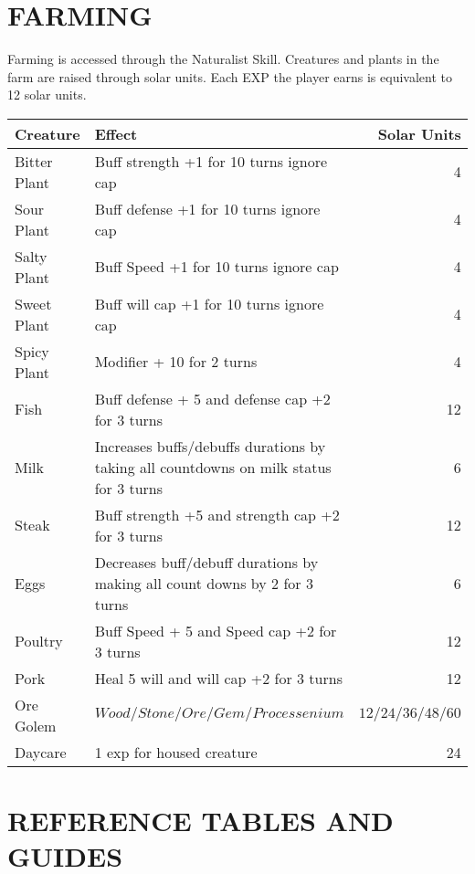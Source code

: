 \section{FARMING}
Farming is accessed through the Naturalist Skill.  Creatures and plants in the farm are raised through solar units.  Each EXP the player earns is equivalent to 12 solar units.\\
\begin{tabularx}{\textwidth}{l X r}
\hline
Creature & Effect & Solar Units \\
\hline
Bitter Plant& Buff strength +1 for 10 turns ignore cap & 4\\
Sour Plant & Buff defense +1 for 10 turns ignore cap & 4\\
Salty Plant & Buff Speed +1 for 10 turns ignore cap & 4 \\
Sweet Plant & Buff will cap +1 for 10 turns ignore cap & 4\\
Spicy Plant & Modifier + 10 for 2 turns & 4\\
Fish & Buff defense + 5 and defense cap +2 for 3 turns & 12 \\
Milk & Increases buffs/debuffs durations by taking all countdowns on milk status for 3 turns & 6\\
Steak & Buff strength +5 and strength cap +2 for 3 turns & 12\\
Eggs & Decreases buff/debuff durations by making all count downs by 2 for 3 turns &6\\
Poultry &  Buff Speed + 5 and Speed cap +2 for 3 turns & 12 \\
Pork & Heal 5 will and will cap +2 for 3 turns &12 \\
Ore Golem & $Wood/Stone/Ore/Gem/Processenium$ & $12/24/36/48/60$ \\
Daycare & 1 exp for housed creature & 24\\
\end{tabularx}

\section{REFERENCE TABLES AND GUIDES}
